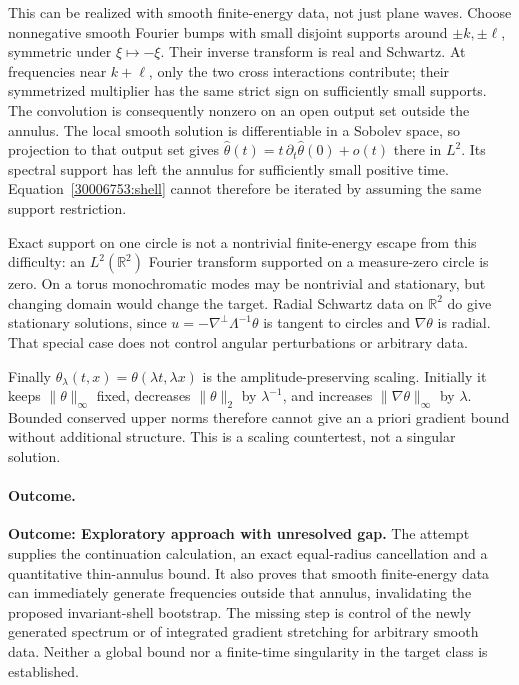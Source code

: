 \documentclass[11pt,a4paper]{article}
\newcommand{\R}{\mathbb{R}}
\numberwithin{equation}{section}
\begin{document}
This can be realized with smooth finite-energy data, not just plane waves.
Choose nonnegative smooth Fourier bumps with small disjoint supports around
$\pm k,\pm\ell$, symmetric under $\xi\mapsto-\xi$. Their inverse transform
is real and Schwartz. At frequencies near $k+\ell$, only the two cross
interactions contribute; their symmetrized multiplier has the same strict
sign on sufficiently small supports. The convolution is consequently
nonzero on an open output set outside the annulus. The local smooth solution
is differentiable in a Sobolev space, so projection to that output set gives
$\widehat\theta(t)=t\,\partial_t\widehat\theta(0)+o(t)$ there in $L^2$.
Its spectral support has left the annulus for sufficiently small positive
time. Equation~\eqref{30006753:shell} cannot therefore be iterated by assuming
the same support restriction.

Exact support on one circle is not a nontrivial finite-energy escape from
this difficulty: an $L^2(\R^2)$ Fourier transform supported on a
measure-zero circle is zero. On a torus monochromatic modes may be
nontrivial and stationary, but changing domain would change the target.
Radial Schwartz data on $\R^2$ do give stationary solutions, since
$u=-\nabla^\perp\Lambda^{-1}\theta$ is tangent to circles and
$\nabla\theta$ is radial. That special case does not control angular
perturbations or arbitrary data.

Finally $\theta_\lambda(t,x)=\theta(\lambda t,\lambda x)$ is the
amplitude-preserving scaling. Initially it keeps $\|\theta\|_\infty$
fixed, decreases $\|\theta\|_2$ by $\lambda^{-1}$, and increases
$\|\nabla\theta\|_\infty$ by $\lambda$. Bounded conserved upper norms
therefore cannot give an a priori gradient bound without additional
structure. This is a scaling countertest, not a singular solution.

\paragraph{Outcome.}
\textbf{Outcome: Exploratory approach with unresolved gap.}
The attempt supplies the continuation calculation, an exact equal-radius
cancellation and a quantitative thin-annulus bound. It also proves that
smooth finite-energy data can immediately generate frequencies outside that
annulus, invalidating the proposed invariant-shell bootstrap. The missing
step is control of the newly generated spectrum or of integrated gradient
stretching for arbitrary smooth data. Neither a global bound nor a
finite-time singularity in the target class is established.
\end{document}
